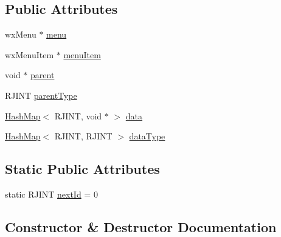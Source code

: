 \subsection*{Public Attributes}
\begin{DoxyCompactItemize}
\item 
wx\+Menu $\ast$ \mbox{\hyperlink{class_rad_j_a_v_1_1_g_u_i_1_1_menu_item_g_u_i_a3a11d95cbb8cf3ae16ee3437fe2a2e80}{menu}}
\item 
wx\+Menu\+Item $\ast$ \mbox{\hyperlink{class_rad_j_a_v_1_1_g_u_i_1_1_menu_item_g_u_i_af8e3bd21e64c94a44e57232b7d72cdef}{menu\+Item}}
\item 
void $\ast$ \mbox{\hyperlink{class_rad_j_a_v_1_1_g_u_i_1_1_menu_item_g_u_i_a7c163b579514638f9ea81c9f96e70657}{parent}}
\item 
R\+J\+I\+NT \mbox{\hyperlink{class_rad_j_a_v_1_1_g_u_i_1_1_menu_item_g_u_i_a1822d606de640f1282579165cfcafd3d}{parent\+Type}}
\item 
\mbox{\hyperlink{namespace_rad_j_a_v_a7c83af3095bdd8035fd71ff008120f08}{Hash\+Map}}$<$ R\+J\+I\+NT, void $\ast$ $>$ \mbox{\hyperlink{class_rad_j_a_v_1_1_g_u_i_1_1_menu_item_g_u_i_a3fc65dfe2978db7d8378bc79e451b17b}{data}}
\item 
\mbox{\hyperlink{namespace_rad_j_a_v_a7c83af3095bdd8035fd71ff008120f08}{Hash\+Map}}$<$ R\+J\+I\+NT, R\+J\+I\+NT $>$ \mbox{\hyperlink{class_rad_j_a_v_1_1_g_u_i_1_1_menu_item_g_u_i_a90c6736fb544b4c757fd757c3e28c04a}{data\+Type}}
\end{DoxyCompactItemize}
\subsection*{Static Public Attributes}
\begin{DoxyCompactItemize}
\item 
static R\+J\+I\+NT \mbox{\hyperlink{class_rad_j_a_v_1_1_g_u_i_1_1_menu_item_g_u_i_a2bef1d942ad77063879a4e35ba666b90}{next\+Id}} = 0
\end{DoxyCompactItemize}


\subsection{Constructor \& Destructor Documentation}
\mbox{\label{class_rad_j_a_v_1_1_g_u_i_1_1_menu_item_g_u_i_aa26bde44354ba8c7270cee1f2672ef94}} 
